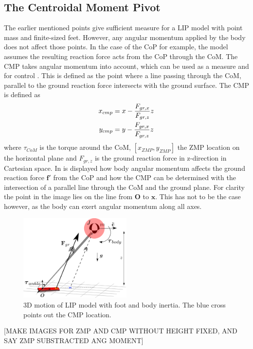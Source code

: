\subsection{The Centroidal Moment Pivot}
The earlier mentioned points give sufficient measure for a \ac{LIP} model with point mass and finite-sized feet. However, any angular momentum applied by the body does not affect those points. In the case of the \ac{CoP} for example, the model assumes the resulting reaction force acts from the \ac{CoP} through the \ac{CoM}. The \ac{CMP} takes angular momentum into account, which can be used as a measure and for control \cite{popovic2005ground}. This is defined as the point where a line passing through the \ac{CoM}, parallel to the ground reaction force intersects with the ground surface. The \ac{CMP} is defined as
\begin{align}
    x_{cmp}&=x-\frac{F_{gr,x}}{F_{gr,z}}z\\
    y_{cmp}&=y-\frac{F_{gr,x}}{F_{gr,z}}z
\end{align}
where $\tau_{CoM}$ is the torque around the \ac{CoM}, $[x_{ZMP},y_{ZMP}]$ the \ac{ZMP} location on the horizontal plane and $F_{gr,z}$ is the ground reaction force in z-direction in Cartesian space. In  is displayed how body angular momentum affects the ground reaction force $\boldsymbol{f'}$ from the \ac{CoP} and how the \ac{CMP} can be determined with the intersection of a parallel line through the \ac{CoM} and the ground plane. For clarity the point in the image lies on the line from $\boldsymbol{O}$ to $\boldsymbol{x}$. This has not to be the case however, as the body can exert angular momentum along all axes. 
\begin{figure}[h]
\centering
\includegraphics[width=0.5\textwidth]{STYLESTUFF/3DCMPCoPviz.png}
\caption{\ac{3D} motion of \ac{LIP} model with foot and body inertia. The blue cross points out the \ac{CMP} location.}
\label{fig:3dlipfootinertia}
\end{figure}
[MAKE IMAGES FOR ZMP AND CMP WITHOUT HEIGHT FIXED, AND SAY ZMP SUBSTRACTED ANG MOMENT]



